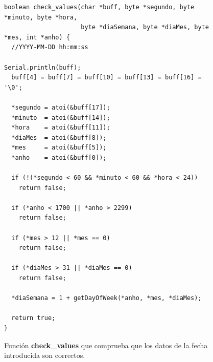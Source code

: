 \documentclass{article}
\begin{document}
\begin{figure}[h]
	\begin{lstlisting}[style=c]
boolean check_values(char *buff, byte *segundo, byte *minuto, byte *hora,
                     byte *diaSemana, byte *diaMes, byte *mes, int *anho) {
  //YYYY-MM-DD hh:mm:ss

Serial.println(buff);  
  buff[4] = buff[7] = buff[10] = buff[13] = buff[16] = '\0';

  *segundo = atoi(&buff[17]);
  *minuto  = atoi(&buff[14]);
  *hora    = atoi(&buff[11]);
  *diaMes  = atoi(&buff[8]);
  *mes     = atoi(&buff[5]);
  *anho    = atoi(&buff[0]);

  if (!(*segundo < 60 && *minuto < 60 && *hora < 24))
    return false;
  
  if (*anho < 1700 || *anho > 2299)
    return false;

  if (*mes > 12 || *mes == 0)
    return false;

  if (*diaMes > 31 || *diaMes == 0)
    return false;

  *diaSemana = 1 + getDayOfWeek(*anho, *mes, *diaMes);
  
  return true;
}
	\end{lstlisting}
	\caption{Función \textbf{check\_values} que comprueba que los datos de la fecha introducida son correctos.}
	\label{cod:p3:check_values}
\end{figure}
\end{document}

